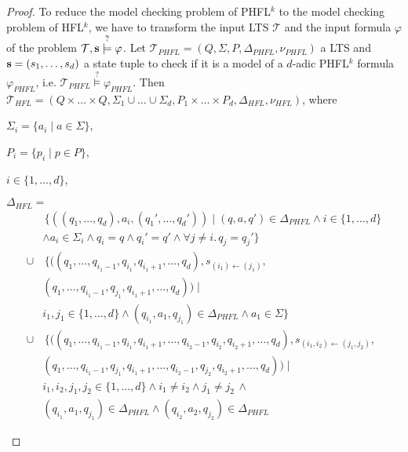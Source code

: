 \begin{proof}
    To reduce the model checking problem of PHFL$^k$ to the model checking problem of HFL$^k$, we have to transform
    the input LTS $\mathcal{T}$ and the input formula $\varphi$ of the problem $\mathcal{T}, \emph{s}
    \overset{?}{\models} \varphi$.
    Let $\mathcal{T}_{PHFL} = (Q, \Sigma, P, \Delta_{PHFL}, \nu_{PHFL})$ a LTS and $\emph{s} = (s_1, \dots, s_d)$ a
    state tuple to check if it is a model of a $d$-adic PHFL$^k$ formula $\varphi_{PHFL}$, i.e. $\mathcal{T}_{PHFL}
    \overset{?}{\models} \varphi_{PHFL}$. Then $\mathcal{T}_{HFL} = (Q \times \dots \times Q, \Sigma_1 \cup \dots
    \cup \Sigma_d, P_1 \times \dots \times P_d, \Delta_{HFL}, \nu_{HFL})$, where
    \begin{compactitem}
        \item $\Sigma_i = \{a_i \mid a \in \Sigma\}$,
        \item $P_i = \{p_i \mid p \in P\}$,
        \item $i \in \{1, \dots, d\}$,
        \item $\Delta_{HFL} =$
        \begin{align*}
                  &\,\{((q_1, \dots, q_d), a_i, ({q_1}', \dots, {q_d}')) \mid (q, a, q') \in \Delta_{PHFL}
                  \wedge i \in \{1, \dots, d\} \\&\wedge a_i \in \Sigma_i \wedge q_i = q \wedge {q_i}' = q' \wedge
                  \forall j \neq i.\, q_j = {q_j}'\}  \\
                  \cup & \,\{((q_1, \dots, q_{i_1 - 1}, q_{i_1}, q_{i_1 + 1}, \dots, q_d), s_{(i_1) \leftarrow (j_1)
                  }, \\&
                  (q_1, \dots, q_{i_1 - 1}, q_{j_1}, q_{i_1 + 1}, \dots, q_d)) \mid \\&
                  i_1, j_1 \in \{1, \dots, d\} \wedge (q_{i_1}, a_1, q_{j_1}) \in \Delta_{PHFL} \wedge a_1 \in
                  \Sigma\} \\
                  \cup & \,\{((q_1, \dots, q_{i_1 - 1}, q_{i_1}, q_{i_1 + 1}, \dots, q_{i_2 - 1}, q_{i_2}, q_{i_2 +
                  1}, \dots, q_d), s_{(i_1, i_2) \leftarrow (j_1, j_2)}, \\&
                  (q_1, \dots, q_{i_1 - 1}, q_{j_1}, q_{i_1 + 1}, \dots, q_{i_2 - 1}, q_{j_2}, q_{i_2 + 1}, \dots, q_d))
                  \mid \\& i_1, i_2, j_1, j_2 \in \{1, \dots, d\} \wedge i_1 \neq i_2 \wedge j_1 \neq j_2 \,\wedge\\&
                   (q_{i_1}, a_1, q_{j_1}) \in \Delta_{PHFL} \wedge (q_{i_2}, a_2, q_{j_2}) \in \Delta_{PHFL}

\end{align*}
\end{compactitem}
\end{proof}
